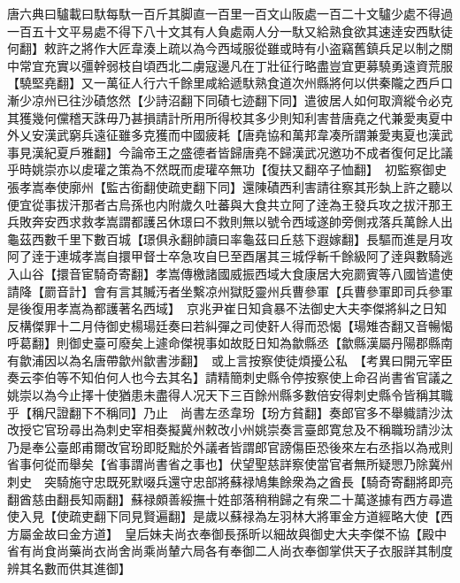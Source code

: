 唐六典曰驢載曰馱每馱一百斤其脚直一百里一百文山阪處一百二十文驢少處不得過一百五十文平易處不得下八十文其有人負處兩人分一馱又給熟食欲其速逹安西馱徒何翻】敕許之將作大匠韋湊上疏以為今西域服從雖或時有小盗竊舊鎮兵足以制之關中常宜充實以彊幹弱枝自頃西北二虜寇邊凡在丁壯征行略盡豈宜更募驍勇遠資荒服【驍堅堯翻】又一萬征人行六千餘里咸給遞馱熟食道次州縣將何以供秦隴之西戶口漸少凉州已往沙磧悠然【少詩沼翻下同磧七迹翻下同】遣彼居人如何取濟縱令必克其獲幾何儻稽天誅毋乃甚損請計所用所得校其多少則知利害昔唐堯之代兼愛夷夏中外乂安漢武窮兵遠征雖多克獲而中國疲耗【唐堯協和萬邦韋凑所謂兼愛夷夏也漢武事見漢紀夏戶雅翻】今論帝王之盛德者皆歸唐堯不歸漢武况邀功不成者復何足比議乎時姚崇亦以䖍瓘之策為不然既而䖍瓘卒無功【復扶又翻卒子恤翻】　初監察御史張孝嵩奉使廓州【監古銜翻使疏吏翻下同】還陳磧西利害請往察其形埶上許之聽以便宜從事拔汗那者古烏孫也内附歲久吐蕃與大食共立阿了逹為王發兵攻之拔汗那王兵敗奔安西求救孝嵩謂都護呂休璟曰不救則無以號令西域遂帥旁側戎落兵萬餘人出龜茲西數千里下數百城【璟俱永翻帥讀曰率龜茲曰丘慈下遐嫁翻】長驅而進是月攻阿了逹于連城孝嵩自擐甲督士卒急攻自巳至酉屠其三城俘斬千餘級阿了逹與數騎逃入山谷【擐音宦騎奇寄翻】孝嵩傳檄諸國威振西域大食康居大宛罽賓等八國皆遣使請降【罽音計】會有言其贓汚者坐繫凉州獄貶靈州兵曹參軍【兵曹參軍即司兵參軍是後復用孝嵩為都護著名西域】　京兆尹崔日知貪暴不法御史大夫李傑將糾之日知反構傑罪十二月侍御史楊瑒廷奏曰若糾彈之司使姧人得而恐愒【瑒雉杏翻又音暢愒呼葛翻】則御史臺可廢矣上遽命傑視事如故貶日知為歙縣丞【歙縣漢屬丹陽郡縣南有歙浦因以為名唐帶歙州歙書涉翻】　或上言按察使徒煩擾公私　【考異曰開元宰臣奏云李伯等不知伯何人也今去其名】請精簡刺史縣令停按察使上命召尚書省官議之姚崇以為今止擇十使猶患未盡得人况天下三百餘州縣多數倍安得刺史縣令皆稱其職乎【稱尺證翻下不稱同】乃止　尚書左丞韋玢【玢方貧翻】奏郎官多不舉軄請沙汰改授它官玢尋出為刺史宰相奏擬冀州敕改小州姚崇奏言臺郎寛怠及不稱職玢請沙汰乃是奉公臺郎甫爾改官玢即貶黜於外議者皆謂郎官謗傷臣恐後來左右丞指以為戒則省事何從而舉矣【省事謂尚書省之事也】伏望聖慈詳察使當官者無所疑愳乃除冀州刺史　突騎施守忠既死默啜兵還守忠部將蘇禄鳩集餘衆為之酋長【騎奇寄翻將即亮翻酋慈由翻長知兩翻】蘇禄頗善綏撫十姓部落稍稍歸之有衆二十萬遂據有西方尋遣使入見【使疏吏翻下同見賢遍翻】是歲以蘇禄為左羽林大將軍金方道經略大使【西方屬金故曰金方道】　皇后妹夫尚衣奉御長孫昕以細故與御史大夫李傑不協【殿中省有尚食尚藥尚衣尚舍尚乘尚輦六局各有奉御二人尚衣奉御掌供天子衣服詳其制度辨其名數而供其進御】

